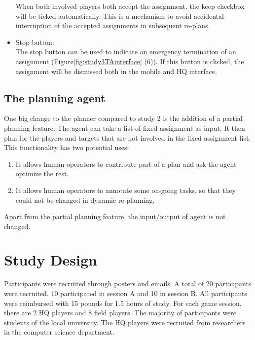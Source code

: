 \begin{itemize}
When both involved players both accept the assignment, the keep checkbox will be ticked automatically. This is a mechanism to avoid accidental interruption of the accepted assignments in subsequent re-plans. \\

\item Stop button: \\
The stop button can be used to indicate an emergency termination of an assignment (Figure\ref{fig:study3TAinterface} (6)). If this button is clicked, the assignment will be dismissed both in the mobile and HQ interface. \\
\end{itemize}



\subsection{The planning agent}\label{sec:studytwoagent}

One big change to the planner compared to study 2 is the addition of a partial planning feature. The agent can take a list of fixed assignment as input. It then plan for the players and targets that are not involved in the fixed assignment list. This functionality has two potential uses: \\

\begin{enumerate}
	\item It allows human operators to contribute part of a plan and ask the agent optimize the rest.\\
	\item It allows human operators to annotate some on-going tasks, so that they could not be changed in dynamic re-planning. \\
\end{enumerate}

Apart from the partial planning feature, the input/output of agent is not changed.\\


\section{Study Design}
Participants were recruited through posters and emails. A total of 20 participants were recruited. 10 participated in session A and 10 in session B. All participants were reimbursed with 15 pounds for 1.5 hours of study. For each game session, there are 2 HQ players and 8 field players. The majority of participants were students of the local university. The HQ players were recruited from researchers in the computer science department. \\

